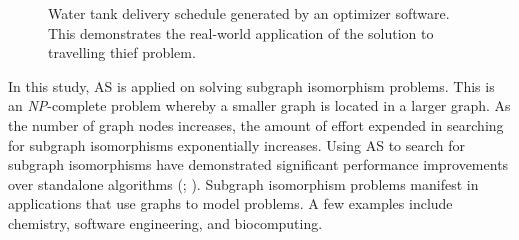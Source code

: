 \begin{figure}[H]
	\centering
	\caption[Water tank delivery schedule generated by an optimizer software]{Water tank delivery schedule generated by an optimizer software. This demonstrates the real-world application of the solution to travelling thief problem. \citep{stolk2013combining}}
	\label{fig:watertank}
\end{figure}

In this study, AS is applied on solving subgraph isomorphism problems. This is an \textit{NP}-complete problem whereby a smaller graph is located in a larger graph. As the number of graph nodes increases, the amount of effort expended in searching for subgraph isomorphisms exponentially increases. Using AS to search for subgraph isomorphisms have demonstrated significant performance improvements over standalone algorithms (\citet{battiti2007algorithm}; \citet{kotthoff2016portfolios}). Subgraph isomorphism problems manifest in applications that use graphs to model problems. A few examples include chemistry, software engineering, and biocomputing.


